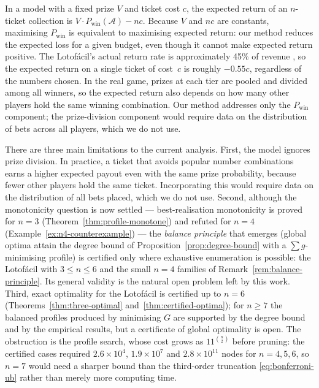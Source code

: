 \begin{remark}
  In a model with a fixed prize $V$ and ticket cost $c$, the expected return
  of an $n$-ticket collection is $V \cdot P_{\mathrm{win}}(\mathcal{A}) - nc$.
  Because $V$ and $nc$ are constants, maximising $P_{\mathrm{win}}$ is
  equivalent to maximising expected return: our method reduces the expected
  loss for a given budget, even though it cannot make expected return positive.
  The Lotof\'{a}cil's actual return rate is approximately 45\% of revenue
  \citep{CEF2024}, so the expected return on a single ticket of cost~$c$ is
  roughly $-0.55c$, regardless of the numbers chosen.  In the real game,
  prizes at each tier are pooled and divided among all winners, so the
  expected return also depends on how many other players hold the same
  winning combination.  Our method addresses only the $P_{\mathrm{win}}$
  component; the prize-division component would require data on the
  distribution of bets across all players, which we do not use.
\end{remark}

There are three main limitations to the current analysis.  First, the
model ignores prize division.  In practice, a ticket that avoids popular
number combinations earns a higher expected payout even with the same
prize probability, because fewer other players hold the same ticket.
Incorporating this would require data on the distribution of all bets
placed, which we do not use.  Second, although the monotonicity question
is now settled --- best-realisation monotonicity is proved for $n = 3$
(Theorem~\ref{thm:profile-monotone}) and refuted for $n = 4$
(Example~\ref{ex:n4-counterexample}) --- the \emph{balance principle}
that emerges (global optima attain the degree bound of
Proposition~\ref{prop:degree-bound} with a $\sum g$-minimising profile)
is certified only where exhaustive enumeration is possible: the
Lotof\'{a}cil with $3 \le n \le 6$ and the small $n = 4$ families of
Remark~\ref{rem:balance-principle}.  Its general validity is the natural
open problem left by this work.  Third, exact optimality for the
Lotof\'{a}cil is certified up to $n = 6$
(Theorems~\ref{thm:three-optimal} and~\ref{thm:certified-optima}); for
$n \ge 7$ the balanced profiles produced by minimising $G$ are supported
by the degree bound and by the empirical results, but a certificate of
global optimality is open.  The obstruction is the profile search, whose
cost grows as $11^{\binom{n}{2}}$ before pruning: the certified cases
required $2.6 \times 10^4$, $1.9 \times 10^7$ and $2.8 \times 10^{11}$
nodes for $n = 4, 5, 6$, so $n = 7$ would need a sharper bound than the
third-order truncation \eqref{eq:bonferroni-ub} rather than merely more
computing time.

